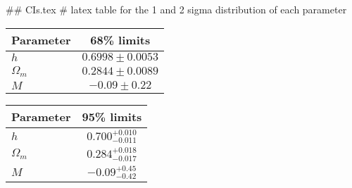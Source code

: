 ## CIs.tex
# latex table for the 1 and 2 sigma distribution of each parameter

\begin{tabular} { l  c}
 Parameter &  68\% limits\\
\hline
{\boldmath$h              $} & $0.6998\pm 0.0053          $\\
{\boldmath$\Omega_m       $} & $0.2844\pm 0.0089          $\\
{\boldmath$M              $} & $-0.09\pm 0.22             $\\
\hline
\end{tabular}

\begin{tabular} { l  c}
 Parameter &  95\% limits\\
\hline
{\boldmath$h              $} & $0.700^{+0.010}_{-0.011}   $\\
{\boldmath$\Omega_m       $} & $0.284^{+0.018}_{-0.017}   $\\
{\boldmath$M              $} & $-0.09^{+0.45}_{-0.42}     $\\
\hline
\end{tabular}

